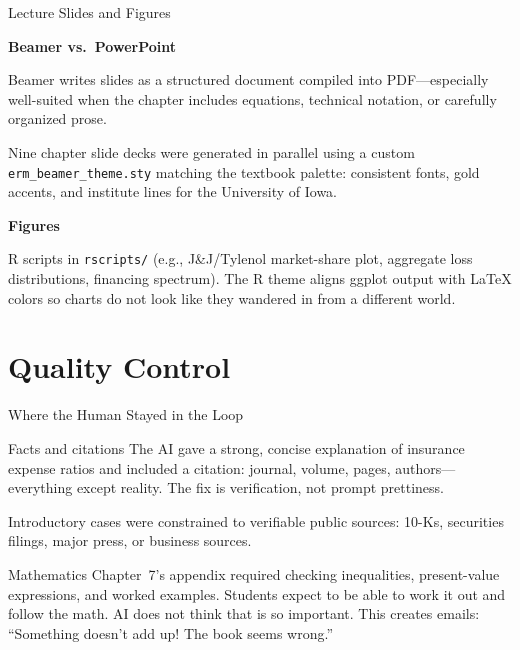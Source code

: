 \documentclass[aspectratio=169]{beamer}
\begin{document}
\begin{frame}{Lecture Slides and Figures}

\textbf{Beamer vs.\ PowerPoint}

\smallskip
Beamer writes slides as a structured document compiled into PDF---especially
well-suited when the chapter includes equations, technical notation, or
carefully organized prose.

\bigskip
Nine chapter slide decks were generated in parallel using a custom
\texttt{erm\_beamer\_theme.sty} matching the textbook palette: consistent
fonts, gold accents, and institute lines for the University of Iowa.

\bigskip
\textbf{Figures}

\smallskip
R scripts in \texttt{rscripts/} (e.g., J\&J/Tylenol market-share plot,
aggregate loss distributions, financing spectrum). The R theme aligns
ggplot output with \LaTeX{} colors so charts do not look like they wandered
in from a different world.

\end{frame}

\section{Quality Control}

\begin{frame}{Where the Human Stayed in the Loop}

\begin{block}{Facts and citations}
The AI gave a strong, concise explanation of insurance expense ratios and
included a citation: journal, volume, pages, authors---everything except
reality. The fix is verification, not prompt prettiness.

Introductory cases were constrained to verifiable public sources: 10-Ks,
securities filings, major press, or business sources.
\end{block}

\bigskip
\begin{block}{Mathematics}
Chapter~7's appendix required checking inequalities, present-value
expressions, and worked examples. Students expect to be able to work it
out and follow the math. AI does not think that is so important. This
creates emails: ``Something doesn't add up! The book seems wrong.''
\end{block}

\end{frame}
\end{document}
